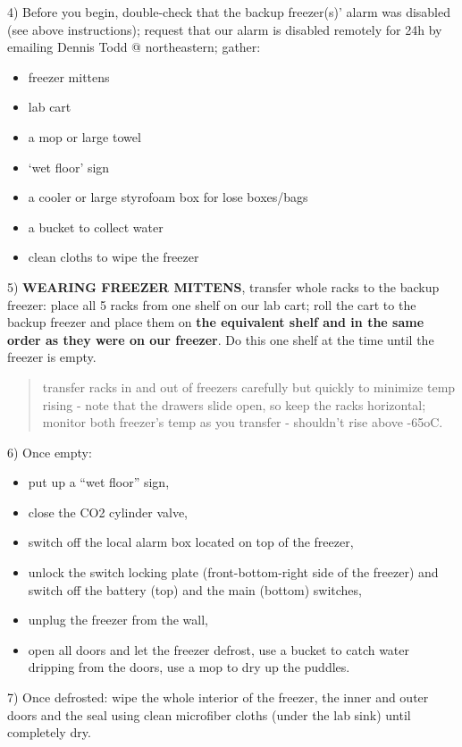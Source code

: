 \documentclass[
  letterpaper,
  DIV=11,
  numbers=noendperiod]{scrreprt}
\begin{document}
4) Before you begin, double-check that the backup freezer(s)' alarm was
disabled (see above instructions); request that our alarm is disabled
remotely for 24h by emailing Dennis Todd @ northeastern; gather:

\begin{itemize}
\item
  freezer mittens
\item
  lab cart
\item
  a mop or large towel
\item
  `wet floor' sign
\item
  a cooler or large styrofoam box for lose boxes/bags
\item
  a bucket to collect water
\item
  clean cloths to wipe the freezer
\end{itemize}

5) \textbf{WEARING FREEZER MITTENS}, transfer whole racks to the backup
freezer: place all 5 racks from one shelf on our lab cart; roll the cart
to the backup freezer and place them on \textbf{the equivalent shelf and
in the same order as they were on our freezer}. Do this one shelf at the
time until the freezer is empty.

\begin{quote}
transfer racks in and out of freezers carefully but quickly to minimize
temp rising - note that the drawers slide open, so keep the racks
horizontal; monitor both freezer's temp as you transfer - shouldn't rise
above -65oC.
\end{quote}

6) Once empty:

\begin{itemize}
\item
  put up a ``wet floor'' sign,
\item
  close the CO2 cylinder valve,
\item
  switch off the local alarm box located on top of the freezer,
\item
  unlock the switch locking plate (front-bottom-right side of the
  freezer) and switch off the battery (top) and the main (bottom)
  switches,
\item
  unplug the freezer from the wall,
\item
  open all doors and let the freezer defrost, use a bucket to catch
  water dripping from the doors, use a mop to dry up the puddles.
\end{itemize}

7) Once defrosted: wipe the whole interior of the freezer, the inner and
outer doors and the seal using clean microfiber cloths (under the lab
sink) until completely dry.
\end{document}
